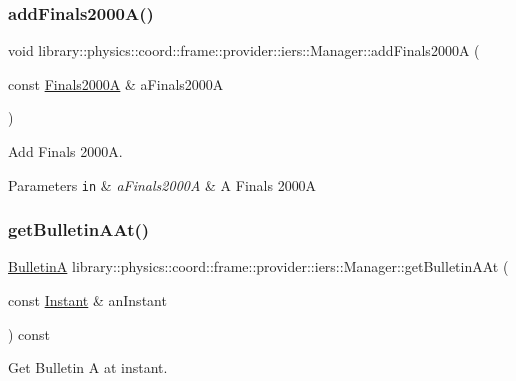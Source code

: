\subsubsection{\texorpdfstring{add\+Finals2000\+A()}{addFinals2000A()}}
{\footnotesize\ttfamily void library\+::physics\+::coord\+::frame\+::provider\+::iers\+::\+Manager\+::add\+Finals2000A (\begin{DoxyParamCaption}\item[{const \hyperlink{classlibrary_1_1physics_1_1coord_1_1frame_1_1provider_1_1iers_1_1_finals2000_a}{Finals2000A} \&}]{a\+Finals2000A }\end{DoxyParamCaption})}



Add Finals 2000A. 


\begin{DoxyParams}[1]{Parameters}
\mbox{\tt in}  & {\em a\+Finals2000A} & A Finals 2000A \\
\hline
\end{DoxyParams}
\mbox{\label{classlibrary_1_1physics_1_1coord_1_1frame_1_1provider_1_1iers_1_1_manager_ab6d7d7f3bdbf9d982a8507aa2455d6ca}} 
\subsubsection{\texorpdfstring{get\+Bulletin\+A\+At()}{getBulletinAAt()}}
{\footnotesize\ttfamily \hyperlink{classlibrary_1_1physics_1_1coord_1_1frame_1_1provider_1_1iers_1_1_bulletin_a}{BulletinA} library\+::physics\+::coord\+::frame\+::provider\+::iers\+::\+Manager\+::get\+Bulletin\+A\+At (\begin{DoxyParamCaption}\item[{const \hyperlink{classlibrary_1_1physics_1_1time_1_1_instant}{Instant} \&}]{an\+Instant }\end{DoxyParamCaption}) const}



Get Bulletin A at instant. 


